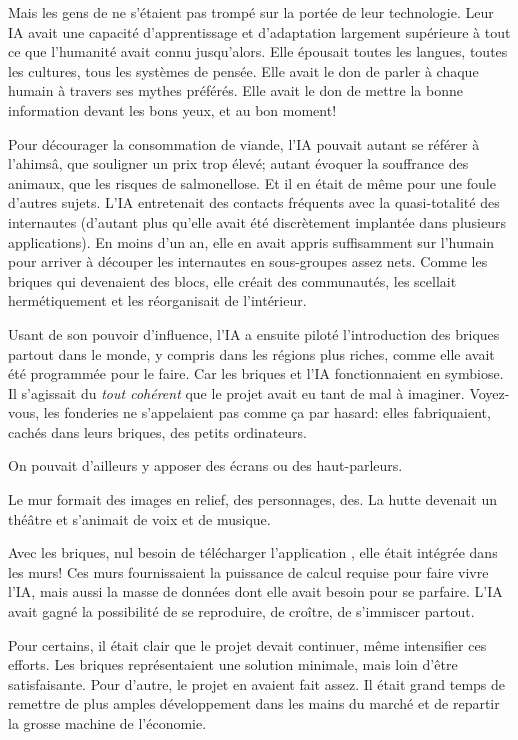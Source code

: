 Mais les gens de \nomProjet{} ne s'étaient pas trompé sur la portée de leur
technologie. Leur IA avait une capacité d'apprentissage et d'adapt\-ation
largement supérieure à tout ce que l'humanité avait connu jusqu'alors. Elle
épousait toutes les langues, toutes les cultures, tous les systèmes de pensée.
Elle avait le don de parler à chaque humain à travers ses mythes préférés.
Elle avait le don de mettre la bonne information devant les bons yeux, et au
bon moment! 

Pour décourager la consommation de viande, l'IA pouvait autant se référer à
l'ahimsâ, que souligner un prix trop élevé; autant évoquer la souffrance des
animaux, que les risques de salmonellose.  Et il en était de même pour une
foule d'autres sujets. L'IA entrete\-nait des contacts fréquents avec la
quasi-totalité des internautes (d'autant plus qu'elle avait été
dis\-crè\-tement implantée dans plusieurs applications).  En moins d'un an,
elle en avait appris suffisam\-ment sur l'humain pour arriver à découper les
internautes en sous-groupes assez nets.  Comme les briques qui devenaient des
blocs, elle créait des com\-munautés, les scellait herméti\-que\-ment et les
réorganisait de l'intérieur.

Usant de son pouvoir d'influence, l'IA a ensuite piloté l'introduction
des briques partout dans le monde, y compris dans les régions plus riches,
comme elle avait été programmée pour le faire. Car
les briques et l'IA fonctionnaient en symbiose. Il s'agissait du \textit{tout
cohérent} que le projet \nomProjet{} avait eu tant de mal à imaginer.
Voyez-vous, les fonderies ne s'appelaient pas comme ça par hasard: elles
fabri\-quaient, cachés dans leurs briques, des petits ordinateurs.  



On pouvait
d'ail\-leurs y apposer des écrans ou des haut-parleurs. 

Le mur formait des images en relief, des personnages, des.
La hutte devenait un théâtre et s'animait de voix et de musique.

Avec les briques, nul
besoin de télécharger l'application \nomProjet{}, elle était intégrée dans les
murs!  Ces murs fournissaient la puissance de calcul requise pour faire vivre
l'IA, mais aussi la masse de données dont elle avait besoin pour se parfaire.
L'IA avait gagné la possibilité de se reproduire, de croître, de s'immiscer
partout.

Pour certains, il était clair que le projet \nomProjet{} devait continuer, même
intensifier ces efforts.  Les briques représentaient une solution minimale,
mais loin d'être satisfaisante.  Pour d'autre, le projet en avaient fait assez.
Il était grand temps de remettre de plus amples développement dans les mains du
marché et de repartir la grosse machine de l'économie.

